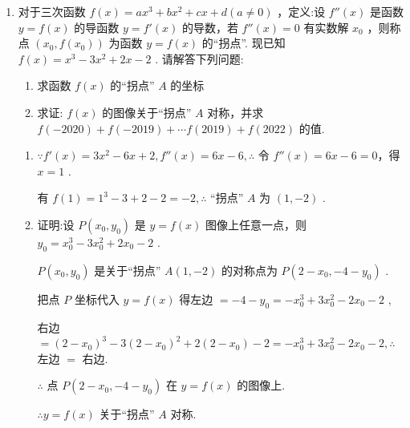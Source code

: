 \begin{enumerate}
\begin{enumerate}
        \item 对于三次函数 $f\left( x\right)  = a{x}^{3} + b{x}^{2} + {cx} + d\left( {a \neq  0}\right)$ ，定义:设 ${f}''\left( x\right)$ 是函数 $y = f\left( x\right)$ 的导函数 $y = f'\left( x\right)$ 的导数，若 ${f}''\left( x\right)  = 0$ 有实数解 ${x}_{0}$ ，则称点 $\left( {{x}_{0},f\left( {x}_{0}\right) }\right)$ 为函数 $y = f\left( x\right)$ 的“拐点”. 现已知 $f\left( x\right)  = {x}^{3} - 3{x}^{2} + {2x} - 2$ . 请解答下列问题:
        \begin{enumerate}
            \item 求函数 $f\left( x\right)$ 的“拐点” $A$ 的坐标
            \item 求证: $f\left( x\right)$ 的图像关于“拐点” $A$ 对称，并求 $f\left( {-{2020}}\right)  + f\left( {-{2019}}\right)  + \cdots f\left( {2019}\right)  + f\left( {2022}\right)$ 的值.
        \end{enumerate}
        \begin{jieda}
            \begin{enumerate}
                \item $\because f'\left( x\right)  = 3{x}^{2} - {6x} + 2,f''\left( x\right)  = {6x} - 6,\therefore$ 令 $f''\left( x\right)  = {6x} - 6 = 0$，得 $x = 1$ .
                
                有 $f\left( 1\right)  = {1}^{3} - 3 + 2 - 2 =  - 2,\therefore$ “拐点” $A$ 为 $\left( {1, - 2}\right)$ .

                \item 证明:设 $P\left( {{x}_{0},{y}_{0}}\right)$ 是 $y = f\left( x\right)$ 图像上任意一点，则 ${y}_{0} = {x}_{0}^{3} - 3{x}_{0}^{2} + 2{x}_{0} - 2$ .
                
                $P\left( {{x}_{0},{y}_{0}}\right)$ 是关于“拐点” $A\left( {1, - 2}\right)$ 的对称点为 $P\left( {2 - {x}_{0}, - 4 - {y}_{0}}\right)$ .
                
                把点 $P$ 坐标代入 $y = f\left( x\right)$ 得左边 $=  - 4 - {y}_{0} =  - {x}_{0}^{3} + 3{x}_{0}^{2} - 2{x}_{0} - 2$ ,
                
                右边 $= {\left( 2 - {x}_{0}\right) }^{3} - 3{\left( 2 - {x}_{0}\right) }^{2} + 2\left( {2 - {x}_{0}}\right)  - 2 =  - {x}_{0}^{3} + 3{x}_{0}^{2} - 2{x}_{0} - 2,\therefore$ 左边 $=$ 右边.
                
                $\therefore$ 点 $P\left( {2 - {x}_{0}, - 4 - {y}_{0}}\right)$ 在 $y = f\left( x\right)$ 的图像上.
                
                $\therefore y = f\left( x\right)$ 关于“拐点” $A$ 对称.
                

\end{enumerate}
\end{jieda}
\end{enumerate}
\end{enumerate}
